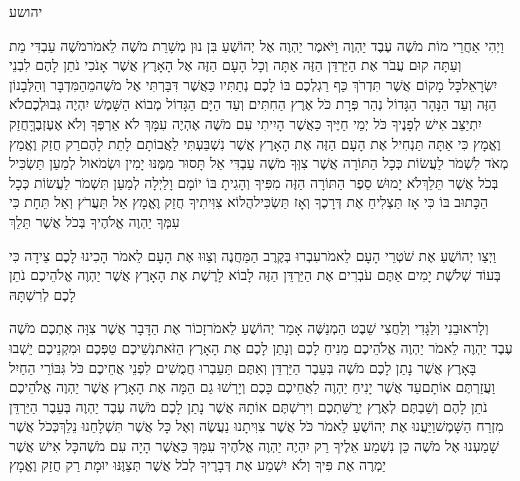 \documentclass[../main/main.tex]{subfiles}
\begin{document}
\thispagestyle{empty}
\Incipit{}יהושע
\cleardoublepage
\RTLmulticolcolumns
\begin{multicols*}{\ncols}
וַיְהִי אַחֲרֵי מוֹת מֹשֶׁה עֶבֶד יַהְוֶה וַיֹּאמֶר יַהְוֶה אֶל יְהוֹשֻׁעַ בִּן נוּן מְשָׁרֵת מֹשֶׁה לֵאמֹר\PreVerseSpace{}מֹשֶׁה עַבְדִּי מֵת וְעַתָּה קוּם עֲבֹר אֶת הַיַּרְדֵּן הַזֶּה אַתָּה וְכָל הָעָם הַזֶּה אֶל הָאָרֶץ אֲשֶׁר אָנֹכִי נֹתֵן לָהֶם לִבְנֵי יִשְׂרָאֵל\PreVerseSpace{}כָּל מָקוֹם אֲשֶׁר תִּדְרֹךְ כַּף רַגְלְכֶם בּוֹ לָכֶם נְתַתִּיו כַּאֲשֶׁר דִּבַּרְתִּי אֶל מֹשֶׁה\PreVerseSpace{}מֵהַמִּדְבָּר וְהַלְּבָנוֹן הַזֶּה וְעַד הַנָּהָר הַגָּדוֹל נְהַר פְּרָת כֹּל אֶרֶץ הַחִתִּים וְעַד הַיָּם הַגָּדוֹל מְבוֹא הַשָּׁמֶשׁ יִהְיֶה גְּבוּלְכֶם\PreVerseSpace{}לֹא יִתְיַצֵּב אִישׁ לְפָנֶיךָ כֹּל יְמֵי חַיֶּיךָ כַּאֲשֶׁר הָיִיתִי עִם מֹשֶׁה אֶהְיֶה עִמָּךְ לֹא אַרְפְּךָ וְלֹא אֶעֶזְבֶךָּ\PreVerseSpace{}חֲזַק וֶאֱמָץ כִּי אַתָּה תַּנְחִיל אֶת הָעָם הַזֶּה אֶת הָאָרֶץ אֲשֶׁר נִשְׁבַּעְתִּי לַאֲבוֹתָם לָתֵת לָהֶם\PreVerseSpace{}רַק חֲזַק וֶאֱמַץ מְאֹד לִשְׁמֹר לַעֲשׂוֹת כְּכָל הַתּוֹרָה אֲשֶׁר צִוְּךָ מֹשֶׁה עַבְדִּי אַל תָּסוּר מִמֶּנּוּ יָמִין וּשְׂמֹאול לְמַעַן תַּשְׂכִּיל בְּכֹל אֲשֶׁר תֵּלֵךְ\PreVerseSpace{}לֹא יָמוּשׁ סֵפֶר הַתּוֹרָה הַזֶּה מִפִּיךָ וְהָגִיתָ בּוֹ יוֹמָם וָלַיְלָה לְמַעַן תִּשְׁמֹר לַעֲשׂוֹת כְּכָל הַכָּתוּב בּוֹ כִּי אָז תַּצְלִיחַ אֶת דְּרָכֶךָ וְאָז תַּשְׂכִּיל\PreVerseSpace{}הֲלוֹא צִוִּיתִיךָ חֲזַק וֶאֱמָץ אַל תַּעֲרֹץ וְאַל תֵּחָת כִּי עִמְּךָ יַהְוֶה אֱלֹהֶיךָ בְּכֹל אֲשֶׁר תֵּלֵךְ\OpenSection{}\par
{}וַיְצַו יְהוֹשֻׁעַ אֶת שֹׁטְרֵי הָעָם לֵאמֹר\PreVerseSpace{}עִבְרוּ בְּקֶרֶב הַמַּחֲנֶה וְצַוּוּ אֶת הָעָם לֵאמֹר הָכִינוּ לָכֶם צֵידָה כִּי בְּעוֹד שְׁלֹשֶׁת יָמִים אַתֶּם עֹבְרִים אֶת הַיַּרְדֵּן הַזֶּה לָבוֹא לָרֶשֶׁת אֶת הָאָרֶץ אֲשֶׁר יַהְוֶה אֱלֹהֵיכֶם נֹתֵן לָכֶם לְרִשְׁתָּהּ\OpenSection{}\par
{}וְלָראוּבֵנִי וְלַגָּדִי וְלַחֲצִי שֵׁבֶט הַמְנַשֶּׁה אָמַר יְהוֹשֻׁעַ לֵאמֹר\PreVerseSpace{}זָכוֹר אֶת הַדָּבָר אֲשֶׁר צִוָּה אֶתְכֶם מֹשֶׁה עֶבֶד יַהְוֶה לֵאמֹר יַהְוֶה אֱלֹהֵיכֶם מֵנִיחַ לָכֶם וְנָתַן לָכֶם אֶת הָאָרֶץ הַזֹּאת\PreVerseSpace{}נְשֵׁיכֶם טַפְּכֶם וּמִקְנֵיכֶם יֵשְׁבוּ בָּאָרֶץ אֲשֶׁר נָתַן לָכֶם מֹשֶׁה בְּעֵבֶר הַיַּרְדֵּן וְאַתֶּם תַּעַבְרוּ חֲמֻשִׁים לִפְנֵי אֲחֵיכֶם כֹּל גִּבּוֹרֵי הַחַיִל וַעֲזַרְתֶּם אוֹתָם\PreVerseSpace{}עַד אֲשֶׁר יָנִיחַ יַהְוֶה לַאֲחֵיכֶם כָּכֶם וְיָרְשׁוּ גַם הֵמָּה אֶת הָאָרֶץ אֲשֶׁר יַהְוֶה אֱלֹהֵיכֶם נֹתֵן לָהֶם וְשַׁבְתֶּם לְאֶרֶץ יְרֻשַּׁתְכֶם וִירִשְׁתֶּם אוֹתָהּ אֲשֶׁר נָתַן לָכֶם מֹשֶׁה עֶבֶד יַהְוֶה בְּעֵבֶר הַיַּרְדֵּן מִזְרַח הַשָּׁמֶשׁ\PreVerseSpace{}וַיַּעֲנוּ אֶת יְהוֹשֻׁעַ לֵאמֹר כֹּל אֲשֶׁר צִוִּיתָנוּ נַעֲשֶׂה וְאֶל כָּל אֲשֶׁר תִּשְׁלָחֵנוּ נֵלֵךְ\PreVerseSpace{}כְּכֹל אֲשֶׁר שָׁמַעְנוּ אֶל מֹשֶׁה כֵּן נִשְׁמַע אֵלֶיךָ רַק יִהְיֶה יַהְוֶה אֱלֹהֶיךָ עִמָּךְ כַּאֲשֶׁר הָיָה עִם מֹשֶׁה\PreVerseSpace{}כָּל אִישׁ אֲשֶׁר יַמְרֶה אֶת פִּיךָ וְלֹא יִשְׁמַע אֶת דְּבָרֶיךָ לְכֹל אֲשֶׁר תְּצַוֶּנּוּ יוּמָת רַק חֲזַק וֶאֱמָץ\OpenSection{}\par

\end{multicols*}
\end{document}
